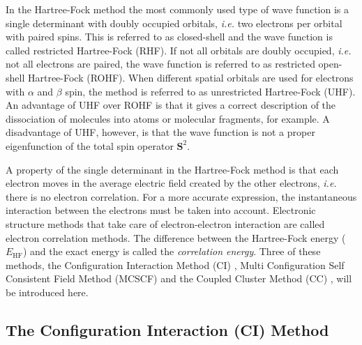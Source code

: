 In the Hartree-Fock method the most commonly used type of wave function is a single determinant with doubly occupied orbitals, \textit{i.e.} two electrons per orbital with paired spins. This is referred to as closed-shell and the wave function is called restricted Hartree-Fock (RHF). If not all orbitals are doubly occupied, \textit{i.e.} not all electrons are paired, the wave function is referred to as restricted open-shell Hartree-Fock (ROHF). When different spatial orbitals are used for electrons with $\alpha$ and $\beta$ spin, the method is referred to as unrestricted Hartree-Fock (UHF). An advantage of UHF over ROHF is that it gives a correct description of the dissociation of molecules into atoms or molecular fragments, for example. A disadvantage of UHF, however, is that the wave function is not a proper eigenfunction of the total spin operator $\mathbf{S}^2$.

A property of the single determinant in the Hartree-Fock method is that each electron moves in the average electric field created by the other electrons, \textit{i.e.} there is no electron correlation. For a more accurate expression, the instantaneous interaction between the electrons must be taken into account. Electronic structure methods that take care of electron-electron interaction are called electron correlation methods. The difference between the Hartree-Fock energy ($E_\mathrm{HF}$) and the exact energy is called the \textit{correlation energy}. Three of these methods, the Configuration Interaction Method (CI) \cite{shavitt1,shavitt2}, Multi Configuration Self Consistent Field Method (MCSCF) \cite{daswahl,wahldasbook,mcscf,roos1,roos2} and the Coupled Cluster Method (CC) \cite{cc1,cc2}, will be introduced here.

\subsection{\label{ch1.sec.ci}The Configuration Interaction (CI) Method}

